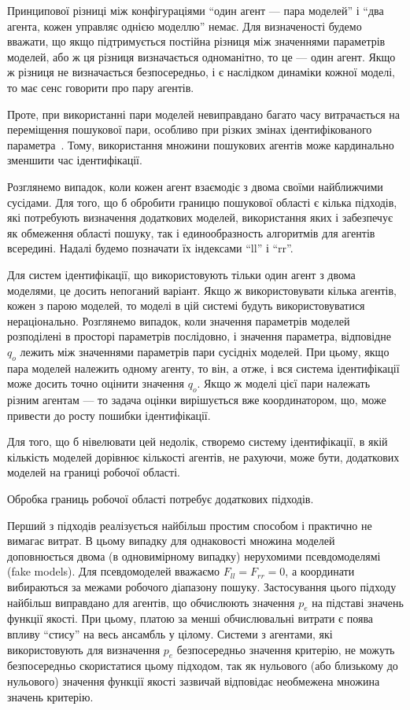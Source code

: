 Принципової різниці між конфігураціями ``один агент --- пара моделей''
і ``два агента, кожен управляє однією моделлю''
немає. Для визначеності будемо вважати, що якщо підтримується
постійна різниця між значеннями параметрів моделей, або ж ця
різниця визначається одноманітно, то це --- один агент. Якщо ж
різниця не визначається безпосередньо, і є наслідком динаміки
кожної моделі, то має сенс говорити про пару агентів.

Проте, при використанні пари моделей невиправдано багато часу
витрачається на переміщення пошукової пари, особливо при різких
змінах ідентифікованого параметра~\cite{atu_asau23}.
Тому, використання множини
пошукових агентів може кардинально зменшити час ідентифікації.


Розглянемо випадок, коли кожен агент взаємодіє з двома
своїми найближчими сусідами. Для того, що б обробити границю
пошукової області є кілька підходів, які потребують визначення
додаткових моделей, використання яких і забезпечує як обмеження
області пошуку, так і единообразность алгоритмів для агентів
всередині. Надалі будемо позначати їх індексами ``ll'' і ``rr''.

Для систем ідентифікації, що використовують тільки один
агент з двома моделями, це досить непоганий варіант. Якщо ж
використовувати кілька агентів, кожен з парою моделей,
то моделі в цій системі будуть використовуватися
нераціонально. Розглянемо випадок, коли значення параметрів
моделей розподілені в просторі параметрів послідовно, і
значення параметра, відповідне
$ q_o $ лежить між значеннями параметрів пари сусідніх моделей. При
цьому, якщо пара моделей належить одному агенту, то він, а отже,
і вся система ідентифікації може досить точно оцінити значення
$ q_o $.
Якщо ж моделі цієї пари належать різним агентам ---
то задача оцінки вирішується вже координатором,
що, може привести до росту пошибки ідентифікації.

Для того, що б нівелювати цей недолік, створемо систему
ідентифікації, в якій кількість моделей дорівнює кількості
агентів, не рахуючи, може бути, додаткових моделей на границі
робочої області.

Обробка границь робочої області потребує додаткових підходів.

Перший з підходів реалізується найбільш простим способом і
практично не вимагає витрат. В цьому випадку для однаковості
множина моделей доповнюється двома (в одновимірному випадку)
нерухомими псевдомоделямі (fake models). Для псевдомоделей вважаємо
$ F_{ll} = F_{rr} = 0 $, а координати вибираються за межами робочого
діапазону пошуку. Застосування цього підходу найбільш
виправдано для агентів, що обчислюють значення
$p_e$ на підставі значень функції якості. При цьому, платою за менші обчислювальні
витрати є поява  впливу ``стису'' на весь ансамбль у
цілому. Системи з агентами, які використовують для визначення
$p_e$ безпосередньо значення критерію, не можуть безпосередньо
скористатися цьому підходом, так як нульового (або близькому
до нульового) значення функції якості зазвичай відповідає
необмежена множина значень критерію.

